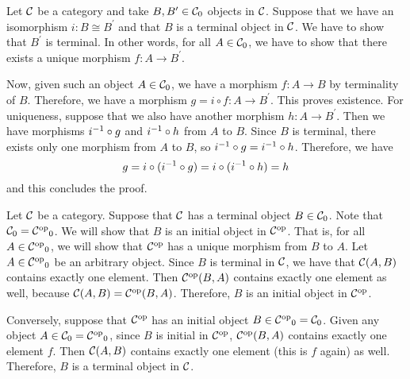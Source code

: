 \begin{solution}\label{sol:terminality_preserved_by_iso}
	Let $ \mathcal{C} $ be a category and take $ B, B^\prime \in {\mathcal{C}}_0 $ objects in $ \mathcal{C} $. Suppose that we have an isomorphism $ i: B \cong B^\prime $ and that $ B $ is a terminal object in $ \mathcal{C} $. We have to show that $ B^\prime $ is terminal. In other words, for all $ A \in {\mathcal{C}}_0 $, we have to show that there exists a unique morphism $ f: A \to B^\prime $.

	Now, given such an object $ A \in {\mathcal{C}}_0 $, we have a morphism $ f: A \to B $ by terminality of $ B $. Therefore, we have a morphism $ g = i \circ f: A \to B^\prime $. This proves existence. For uniqueness, suppose that we also have another morphism $ h: A \to B^\prime $. Then we have morphisms $ i ^{-1} \circ g $ and $ i ^{-1} \circ h $ from $ A $ to $ B $. Since $ B $ is terminal, there exists only one morphism from $ A $ to $ B $, so $ i ^{-1} \circ g = i ^{-1} \circ h $. Therefore, we have 
	\[ g = i \circ (i ^{-1} \circ g) = i \circ (i ^{-1} \circ h) = h \]
	and this concludes the proof.
\end{solution}

\begin{solution}\label{sol:terminal_iff_initial_op}
	Let $ \mathcal{C} $ be a category. Suppose that $ \mathcal{C} $ has a terminal object $ B \in {\mathcal{C}}_0 $. Note that $ {\mathcal{C}}_0 = {{\mathcal{C}}^\text{op}}_0 $. We will show that $ B $ is an initial object in $ {\mathcal{C}}^\text{op} $. That is, for all $ A \in {\ensuremath{{\mathcal{C}}^\text{op}}}_0 $, we will show that $ {\mathcal{C}}^\text{op} $ has a unique morphism from $ B $ to $ A $.
	Let $ A \in {\ensuremath{{\mathcal{C}}^\text{op}}}_0 $ be an arbitrary object. Since $ B $ is terminal in $ \mathcal{C} $, we have that $ \mathcal{C}(A, B) $ contains exactly one element. Then $ {\mathcal{C}}^\text{op}(B, A) $ contains exactly one element as well, because $ \mathcal{C}(A, B) = {\mathcal{C}}^\text{op}(B, A) $. Therefore, $ B $ is an initial object in $ {\mathcal{C}}^\text{op} $.

	Conversely, suppose that $ {\mathcal{C}}^\text{op} $ has an initial object $ B \in {\ensuremath{{\mathcal{C}}^\text{op}}}_0 = {\mathcal{C}}_0 $. Given any object $ A \in {\mathcal{C}}_0 = {{\mathcal{C}}^\text{op}}_0  $, since $ B $ is initial in $ {\mathcal{C}}^\text{op} $, $ {\mathcal{C}}^\text{op}(B, A) $ contains exactly one element $ f $. Then $ \mathcal{C}(A, B) $ contains exactly one element (this is $ f $ again) as well. Therefore, $ B $ is a terminal object in $ \mathcal{C} $.
\end{solution}

